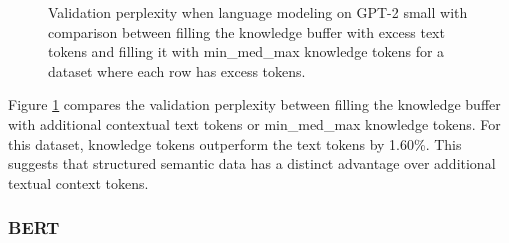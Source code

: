 \documentclass[phd,electronic,oneside,twosidetoc,letterpaper,chaptercenter,parttop,lof]{byumsphd}
\begin{document}
\begin{figure}
\centering
{}  
    \caption[Excess Text vs. Knowledge]{
        Validation perplexity when language modeling on GPT-2 small with comparison between filling the knowledge buffer with excess text tokens and filling it with min\_med\_max knowledge tokens for a dataset where each row has excess tokens.
    }
    \label{fig:text-knowledge-baseline-chart}
\end{figure}

Figure \ref{fig:text-knowledge-baseline-chart} compares the validation perplexity between filling the knowledge buffer with additional contextual text tokens or min\_med\_max knowledge tokens.
For this dataset, knowledge tokens outperform the text tokens by 1.60\%.
This suggests that structured semantic data has a distinct advantage over additional textual context tokens. 


\subsubsection{BERT}
\end{document}

